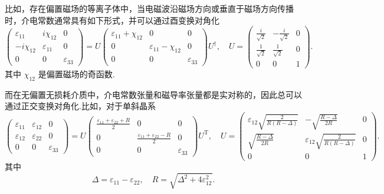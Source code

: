 比如，存在偏置磁场的等离子体中，当电磁波沿磁场方向或垂直于磁场方向传播时，介电常数通常具有如下形式，并可以通过酉变换对角化
\begin{equation*}
	\begin{pmatrix}\varepsilon_{11} & i\chi_{12} & 0 \\ -i\chi_{12} & \varepsilon_{11} & 0 \\ 0 & 0 & \varepsilon_{33}\end{pmatrix} =U \begin{pmatrix}\varepsilon_{11}+\chi_{12} & 0 & 0 \\ 0 & \varepsilon_{11}-\chi_{12} & 0 \\ 0 & 0 & \varepsilon_{33}\end{pmatrix}U^\dagger,\quad U=\begin{pmatrix}\frac{i}{\sqrt{2}} & -\frac{i}{\sqrt{2}} & 0 \\ \frac{1}{\sqrt{2}} & \frac{1}{\sqrt{2}} & 0 \\ 0 & 0 & 1\end{pmatrix}.
\end{equation*}
其中 \(\chi_{12}\) 是偏置磁场的奇函数.

而在无偏置无损耗介质中，介电常数张量和磁导率张量都是实对称的，因此总可以通过正交变换对角化.比如，对于单斜晶系
\begin{equation*}
	\begin{pmatrix}\varepsilon_{11} & \varepsilon_{12} & 0 \\ \varepsilon_{12} & \varepsilon_{22} & 0 \\ 0 & 0 & \varepsilon_{33}\end{pmatrix}= U\begin{pmatrix}\frac{\varepsilon_{11}+\varepsilon_{22}+R}{2} & 0 & 0 \\ 0 & \frac{\varepsilon_{11}+\varepsilon_{22}-R}{2} & 0 \\ 0 & 0 & \varepsilon_{33}\end{pmatrix}U^\mathrm{T},\quad U=\begin{pmatrix}\varepsilon_{12}\sqrt{\frac{2}{R(R-\Delta)}} & -\sqrt{\frac{R-\Delta}{2R}} & 0 \\ \sqrt{\frac{R-\Delta}{2R}} & \varepsilon_{12}\sqrt{\frac{2}{R(R-\Delta)}} & 0 \\ 0 & 0 & 1\end{pmatrix}.
\end{equation*}
其中
\begin{equation*}
	\Delta=\varepsilon_{11}-\varepsilon_{22},\quad R=\sqrt{\Delta^2+4\varepsilon_{12}^2}.
\end{equation*}

